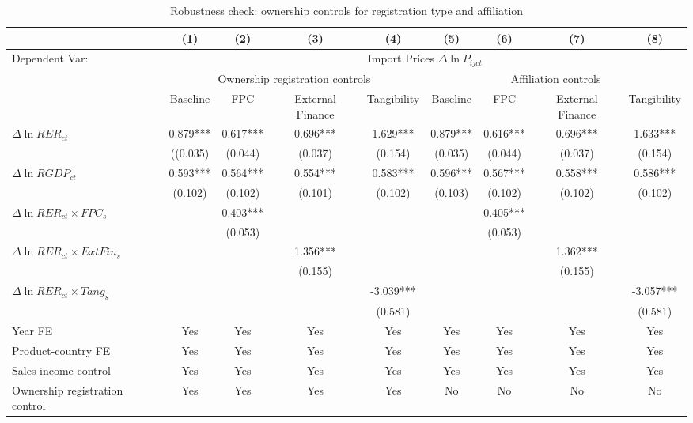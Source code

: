 \begin{table}
	\centering
	\caption{Robustness check: ownership controls for registration type and affiliation}
	\begin{threeparttable}
		\begin{tabular}{lcccccccc}
			\toprule
			& (1)   & (2)   & (3)   & (4) &  (5)  &  (6)  & (7)  & (8)\\
			\midrule
                Dependent Var: & \multicolumn{8}{c}{ Import Prices $\Delta \ln P_{ijct}$} \\
			& \multicolumn{4}{c}{Ownership registration controls} & \multicolumn{4}{c}{Affiliation controls}\\
			& Baseline & FPC   & External Finance & Tangibility & Baseline & FPC & External Finance & Tangibility\\
			\midrule
			$\Delta \ln RER_{ct}$ & 0.879*** & 0.617*** & 0.696*** & 1.629*** & 0.879*** & 0.616*** & 0.696*** & 1.633*** \\
			& ((0.035) & (0.044) & (0.037) & (0.154) & (0.035) & (0.044) & (0.037) & (0.154) \\
			$\Delta \ln RGDP_{ct}$ & 0.593*** & 0.564*** & 0.554*** & 0.583*** & 0.596*** & 0.567*** & 0.558*** & 0.586*** \\
			& (0.102) & (0.102) & (0.101) & (0.102) & (0.103) & (0.102) & (0.102) & (0.102) \\
			$\Delta \ln RER_{ct} \times FPC_{s}$ &    & 0.403*** &       &       &       & 0.405*** &       &  \\
			&  & (0.053) &       &       &       & (0.053) &       &  \\
			$\Delta \ln RER_{ct} \times ExtFin_{s}$ &    &       & 1.356*** &       &       &       & 1.362*** &  \\
			&   &       & (0.155) &       &       &       & (0.155) &  \\
			$\Delta \ln RER_{ct} \times Tang_{s}$ &     &       &       & -3.039*** &       &       &       & -3.057*** \\
			&   &       &       & (0.581) &       &       &       & (0.581) \\
                \midrule
			Year FE  &  Yes   & Yes   & Yes   & Yes & Yes   & Yes   & Yes   & Yes\\
			Product-country FE &  Yes   & Yes   & Yes   & Yes & Yes   & Yes   & Yes   & Yes\\
			Sales income control &  Yes   & Yes   & Yes   & Yes & Yes   & Yes   & Yes   & Yes\\
			Ownership registration control &  Yes   & Yes & Yes  & Yes & No & No & No & No\\

\end{tabular}
\end{threeparttable}
\end{table}
